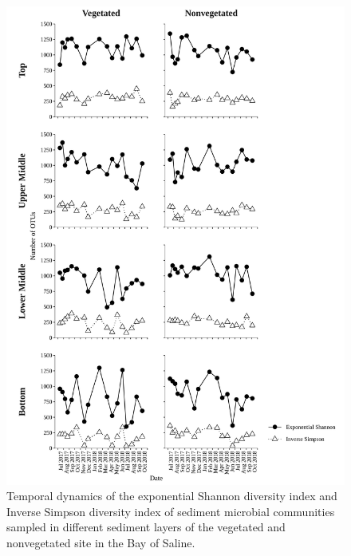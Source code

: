 \documentclass[12pt,]{article}
\begin{document}
\begin{figure}[H]

{\centering \includegraphics[width=0.9\linewidth,height=1\textheight]{../results/figures/diversity_indices_month} 

}

\caption{Temporal dynamics of the exponential Shannon diversity index and Inverse Simpson diversity index of sediment microbial communities sampled in different sediment layers of the vegetated and nonvegetated site in the Bay of Saline.\label{indices_moths}}\label{fig:unnamed-chunk-4}
\end{figure}
\end{document}
